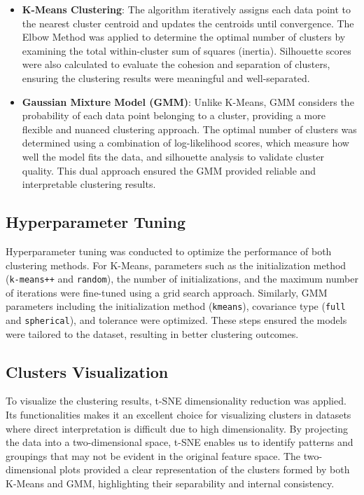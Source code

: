         
        \begin{itemize}
        
            \item \textbf{K-Means Clustering}: The algorithm iteratively assigns each data point to the nearest cluster centroid and updates the centroids until convergence. The Elbow Method was applied to determine the optimal number of clusters by examining the total within-cluster sum of squares (inertia). Silhouette scores were also calculated to evaluate the cohesion and separation of clusters, ensuring the clustering results were meaningful and well-separated.
            
            \item \textbf{Gaussian Mixture Model (GMM)}: Unlike K-Means, GMM considers the probability of each data point belonging to a cluster, providing a more flexible and nuanced clustering approach. The optimal number of clusters was determined using a combination of log-likelihood scores, which measure how well the model fits the data, and silhouette analysis to validate cluster quality. This dual approach ensured the GMM provided reliable and interpretable clustering results.
            
        \end{itemize}

    \subsection{Hyperparameter Tuning}
    
        Hyperparameter tuning was conducted to optimize the performance of both clustering methods. For K-Means, parameters such as the initialization method (\texttt{k-means++} and \texttt{random}), the number of initializations, and the maximum number of iterations were fine-tuned using a grid search approach. Similarly, GMM parameters including the initialization method (\texttt{kmeans}), covariance type (\texttt{full} and \texttt{spherical}), and tolerance were optimized. These steps ensured the models were tailored to the dataset, resulting in better clustering outcomes.

    \subsection{Clusters Visualization}
    
        To visualize the clustering results, t-SNE dimensionality reduction was applied. Its functionalities makes it an excellent choice for visualizing clusters in datasets where direct interpretation is difficult due to high dimensionality. By projecting the data into a two-dimensional space, t-SNE enables us to identify patterns and groupings that may not be evident in the original feature space. The two-dimensional plots provided a clear representation of the clusters formed by both K-Means and GMM, highlighting their separability and internal consistency.
        
